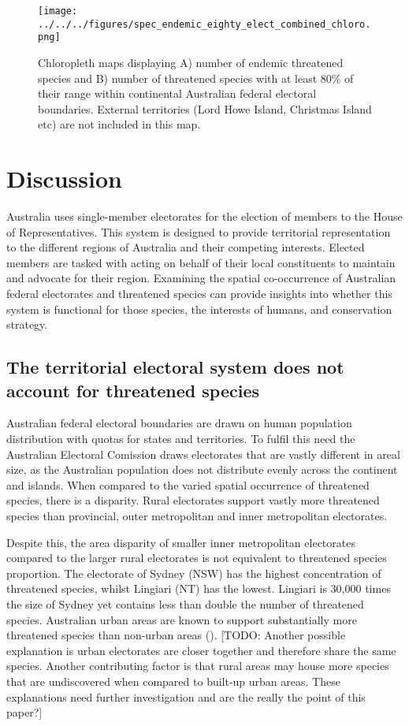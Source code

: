 \documentclass[a4paper,11pt]{article}
\begin{document}
\begin{figure}[H]
	\centering
    \texttt{[image: ../../../figures/spec\_endemic\_eighty\_elect\_combined\_chloro.png]}
    \caption{Chloropleth maps displaying A) number of endemic threatened species and B) number of threatened species with at least 80\% of their range within continental Australian federal electoral boundaries. External territories (Lord Howe Island, Christmas Island etc) are not included in this map.}
    \label{fig:combined_chloro}
\end{figure}

\section{Discussion}

Australia uses single-member electorates for the election of members to the House of Representatives. This system is designed to provide territorial representation to the different regions of Australia and their competing interests. Elected members are tasked with acting on behalf of their local constituents to maintain and advocate for their region. Examining the spatial co-occurrence of Australian federal electorates and threatened species can provide insights into whether this system is functional for those species, the interests of humans, and conservation strategy.

\subsection{The territorial electoral system does not account for threatened species}

Australian federal electoral boundaries are drawn on human population distribution with quotas for states and territories. To fulfil this need the Australian Electoral Comission draws electorates that are vastly different in areal size, as the Australian population does not distribute evenly across the continent and islands. When compared to the varied spatial occurrence of threatened species, there is a disparity. Rural electorates support vastly more threatened species than provincial, outer metropolitan and inner metropolitan electorates.

Despite this, the area disparity of smaller inner metropolitan electorates compared to the larger rural electorates is not equivalent to threatened species proportion. The electorate of Sydney (NSW) has the highest concentration of threatened species, whilst Lingiari (NT) has the lowest. Lingiari is 30,000 times the size of Sydney yet contains less than double the number of threatened species. Australian urban areas are known to support substantially more threatened species than non-urban areas (\cite{ivesCitiesAreHotspots2016, soanesConservationOpportunitiesThreatened2020}). [TODO: Another possible explanation is urban electorates are closer together and therefore share the same species. Another contributing factor is that rural areas may house more species that are undiscovered when compared to built-up urban areas. These explanations need further investigation and are the really the point of this paper?]
\end{document}
